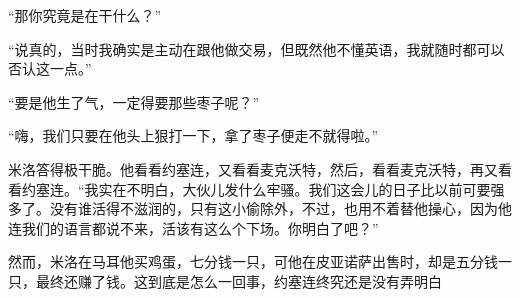     “那你究竟是在干什么？”

    “说真的，当时我确实是主动在跟他做交易，但既然他不懂英语，我就随时都可以否认这一点。”

    “要是他生了气，一定得要那些枣子呢？”

    “嗨，我们只要在他头上狠打一下，拿了枣子便走不就得啦。”

    米洛答得极干脆。他看看约塞连，又看看麦克沃特，然后，看看麦克沃特，再又看看约塞连。“我实在不明白，大伙儿发什么牢骚。我们这会儿的日子比以前可要强多了。没有谁活得不滋润的，只有这小偷除外，不过，也用不着替他操心，因为他连我们的语言都说不来，活该有这么个下场。你明白了吧？”

    然而，米洛在马耳他买鸡蛋，七分钱一只，可他在皮亚诺萨出售时，却是五分钱一只，最终还赚了钱。这到底是怎么一回事，约塞连终究还是没有弄明白
